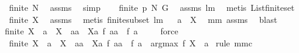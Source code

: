 \begin{isabellebody}
\isamarkupfalse%
\ {\isachardoublequoteopen}finite\ N{\isachardoublequoteclose}\ \isamarkupfalse%
\ assms\ \isamarkupfalse%
\ simp\ \isamarkupfalse%
\ \isanewline
{}\isamarkupfalse%
\ {\isachardoublequoteopen}finite\ {\isacharparenleft}{\isacharquery}p\ N\ {\isacharquery}G{\isacharparenright}{\isachardoublequoteclose}\ \isamarkupfalse%
\ assms\ lm{}{}\ \isamarkupfalse%
\ {\isacharparenleft}metis\ List{\isachardot}finite{\isacharunderscore}set{\isacharparenright}\isanewline
{}\isamarkupfalse%
\ \isamarkupfalse%
\ {\isachardoublequoteopen}finite\ {\isacharquery}X{\isachardoublequoteclose}\ \isamarkupfalse%
\ assms\ \isamarkupfalse%
\ {\isacharparenleft}metis\ finite{\isacharunderscore}subset\ lm{}{}{\isacharparenright}\isanewline
{}\isamarkupfalse%
\ \isamarkupfalse%
\ {\isachardoublequoteopen}{\isacharquery}a\ {\isasymin}\ {\isacharquery}X{\isachardoublequoteclose}\ \isamarkupfalse%
\ mm{}{}\ assms\ \isamarkupfalse%
\ blast\isanewline
{}\isamarkupfalse%
\ \isamarkupfalse%
\ \isanewline
{\isachardoublequoteopen}finite\ {\isacharquery}X\ {\isacharampersand}\ {\isacharquery}a\ {\isasymin}\ {\isacharquery}X\ {\isacharampersand}\ {\isacharparenleft}{\isasymforall}aa\ {\isasymin}\ {\isacharquery}X{\isacharminus}{\isacharbraceleft}{\isacharquery}a{\isacharbraceright}{\isachardot}\ {\isacharquery}f\ aa\ {\isacharless}\ {\isacharquery}f\ {\isacharquery}a{\isacharparenright}{\isachardoublequoteclose}\ \isamarkupfalse%
\ {}\ \isamarkupfalse%
\ force\isanewline
{}\isamarkupfalse%
\ \isamarkupfalse%
\ {\isachardoublequoteopen}{\isacharparenleft}finite\ {\isacharquery}X\ {\isacharampersand}\ {\isacharquery}a\ {\isasymin}\ {\isacharquery}X\ {\isacharampersand}\ {\isacharparenleft}{\isasymforall}aa\ {\isasymin}\ {\isacharquery}X{\isacharminus}{\isacharbraceleft}{\isacharquery}a{\isacharbraceright}{\isachardot}\ {\isacharquery}f\ aa\ {\isacharless}\ {\isacharquery}f\ {\isacharquery}a{\isacharparenright}{\isacharparenright}\ {\isasymlongrightarrow}\ argmax\ {\isacharquery}f\ {\isacharquery}X\ {\isacharequal}\ {\isacharbraceleft}{\isacharquery}a{\isacharbraceright}{\isachardoublequoteclose}\isanewline
{}\isamarkupfalse%
\ {\isacharparenleft}rule\ mm{}{}c{\isacharparenright}\isanewline

\end{isabellebody}
